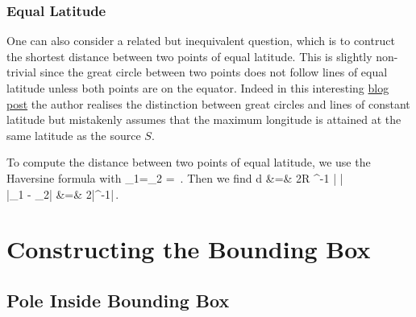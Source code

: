 \documentclass[preprint,12pt]{article}
\begin{document}
\subsubsection{Equal  Latitude}

One can also consider a related but inequivalent question, which is to contruct the shortest distance between two points of equal latitude. This is slightly non-trivial since the great circle between two points does not follow lines of equal latitude unless both points are on the equator. Indeed in this interesting \href{http://janmatuschek.de/LatitudeLongitudeBoundingCoordinates}{blog post} the author realises the distinction between great circles and lines of constant latitude but mistakenly assumes that the maximum longitude is attained at the same latitude as the source $S$. 

To compute the distance between two points of equal latitude, we use the Haversine formula with
\be
\vphi_1=\vphi_2 = \vphi\,.
\ee
Then we find
\bea
d &=&  2R \sin^{-1} \Big| \cos \vphi   \sin \Blp {}\Brp \Big|  \\
\Ra \quad |\lam_1 - \lam_2| &=& 2\left|\sin^{-1}\right|\,.
\eea
 


\section{Constructing the Bounding Box}

\subsection{Pole Inside Bounding Box}
\end{document}
